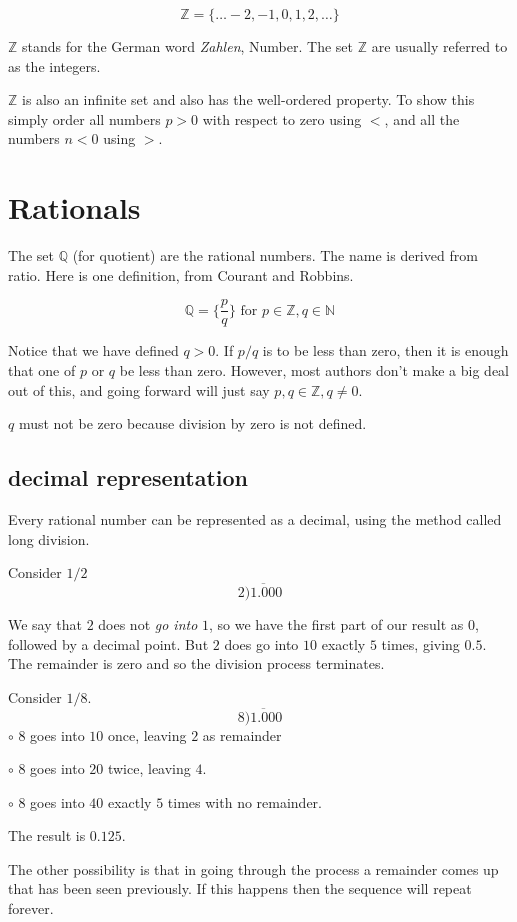 \documentclass[11pt, oneside]{article}
\begin{document}
\[ \mathbb{Z} = \{ \dots -2, -1, 0, 1, 2, \dots \} \]

$\mathbb{Z}$ stands for the German word \emph{Zahlen}, Number.  The set $\mathbb{Z}$ are usually referred to as the integers.

$\mathbb{Z}$ is also an infinite set and also has the well-ordered property.  To show this simply order all numbers $p > 0$ with respect to zero using $<$, and all the numbers $n < 0$ using $>$.

\section{Rationals}

The set $\mathbb{Q}$ (for quotient) are the rational numbers.  The name is derived from ratio.  Here is one definition, from Courant and Robbins.

\[ \mathbb{Q} = \{ \frac{p}{q} \} \text{ for } p \in \mathbb{Z}, q \in \mathbb{N} \]

Notice that we have defined $q > 0$.  If $p/q$ is to be less than zero, then it is enough that one of $p$ or $q$ be less than zero.  However, most authors don't make a big deal out of this, and going forward will just say $p,q \in \mathbb{Z}, q \ne 0$.  

$q$ must not be zero because division by zero is not defined.

\subsection*{decimal representation}

Every rational number can be represented as a decimal, using the method called long division.

Consider $1/2$
\[ 2 \overline{)1.000} \]

We say that $2$ does not \emph{go into} $1$, so we have the first part of our result as $0$, followed by a decimal point.  But $2$ does go into $10$ exactly $5$ times, giving $0.5$.  The remainder is zero and so the division process terminates.

Consider $1/8$.
\[ 8 \overline{)1.000} \]
$\circ$  $8$ goes into $10$ once, leaving $2$ as remainder

$\circ$  $8$ goes into $20$ twice, leaving $4$.  

$\circ$  $8$ goes into $40$ exactly $5$ times with no remainder.

The result is $0.125$.

The other possibility is that in going through the process a remainder comes up that has been seen previously.  If this happens then the sequence will repeat forever.
\end{document}
